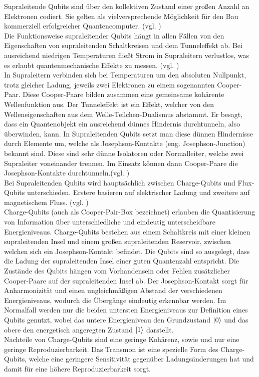 Supraleitende Qubits sind über den kollektiven Zustand einer großen Anzahl an Elektronen codiert.
Sie gelten als vielversprechende Möglichkeit für den Bau kommerziell erfolgreicher Quantencomputer. (vgl. \cite[Ch. 15.1]{bergou_quantum_2021})\\
Die Funktionsweise supraleitender Qubits hängt in allen Fällen von den Eigenschaften von supraleitenden Schaltkreisen und dem Tunneleffekt ab. Bei ausreichend niedrigen Temperaturen fließt Strom in Supraleitern verlustlos, was es erlaubt quantenmechanische Effekte zu messen. (vgl. \cite[Ch. 10.6]{homeister_quantum_2022-1})\\

In Supraleitern verbinden sich bei Temperaturen um den absoluten Nullpunkt, trotz gleicher Ladung, jeweils zwei Elektronen zu einem sogenannten Cooper-Paar. Diese Cooper-Paare bilden zusammen eine gemeinsame kohärente Wellenfunktion aus.
Der Tunneleffekt ist ein Effekt, welcher von den Welleneigenschaften aus dem Welle-Teilchen-Dualismus abstammt.
Er besagt, dass ein Quantenobjekt ein ausreichend dünnes Hindernis durchtunneln, also überwinden, kann.
In Supraleitenden Qubits setzt man diese dünnen Hindernisse durch Elemente um, welche als Josephson-Kontakte (eng. Josephson-Junction) bekannt sind.
Diese sind sehr dünne Isolatoren oder Normalleiter, welche zwei Supraleiter voneinander trennen.
Im Einsatz können dann Cooper-Paare die Josephson-Kontakte durchtunneln.(vgl. \cite[Ch. 10.6]{homeister_quantum_2022-1})\\

Bei Supraleitenden Qubits wird hauptsächlich zwischen Charge-Qubits und Flux-Qubits unterschieden. Erstere basieren auf elektrischer Ladung und zweitere auf magnetischem Fluss. (vgl. \cite[Ch. 15.6]{bergou_quantum_2021})\\
Charge-Qubits (auch als Cooper-Pair-Box bezeichnet) erlauben die Quantisierung von Information über unterschiedliche und eindeutig unterscheidbare Energieniveaus. Charge-Qubits bestehen aus einem Schaltkreis mit einer kleinen supraleitenden Insel und einem großen supraleitenden Reservoir, zwischen welchen sich ein Josephson-Kontakt befindet.
Die Qubits sind so ausgelegt, dass die Ladung der supraleitenden Insel einer guten Quantenzahl entspricht. Die Zustände des Qubits hängen vom Vorhandensein oder Fehlen zusätzlicher Cooper-Paare auf der supraleitenden Insel ab.
Der Josephson-Kontakt sorgt für Anharmonizität und einen ungleichmäßigen Abstand der verschiedenen Energieniveaus, wodurch die Übergänge eindeutig erkennbar werden. Im Normalfall werden nur die beiden untersten Energieniveaus zur Definition eines Qubits genutzt, wobei das untere Energieniveau den Grundzustand $\ket0$ und das obere den energetisch angeregten Zustand $\ket1$ darstellt.\\
Nachteile von Charge-Qubits sind eine geringe Kohärenz, sowie und nur eine geringe Reproduzierbarkeit. Das Transmon ist eine spezielle Form des Charge-Qubits, welche eine geringere Sensitivität gegenüber Ladungsänderungen hat und damit für eine höhere Reproduzierbarkeit sorgt.\\ 

